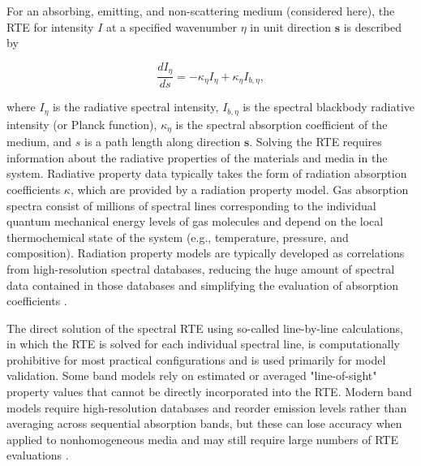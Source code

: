 \documentclass[preprint,12pt]{elsarticle}
\newcounter{bla}
\begin{document}
For an absorbing, emitting, and non-scattering medium (considered here), the RTE for intensity $I$ at a specified wavenumber $\eta$ in unit direction $\mathbf{s}$ is described by
% 
\begin{linenomath}
\begin{equation} \label{e:RTE_general}
    \frac{dI_{\eta}}{ds} = -\kappa_{\eta}I_{\eta} + \kappa_{\eta}I_{b,\eta},
\end{equation}
\end{linenomath}
%
where $I_{\eta}$ is the radiative spectral intensity, $I_{b,\eta}$ is the spectral blackbody radiative intensity (or Planck function), $\kappa_{\eta}$ is the spectral absorption coefficient of the medium, and $s$ is a path length along direction $\mathbf{s}$.  Solving the RTE requires information about the radiative properties of the materials and media in the system.  Radiative property data typically takes the form of radiation absorption coefficients $\kappa$, which are provided by a radiation property model.  Gas absorption spectra consist of millions of spectral lines corresponding to the individual quantum mechanical energy levels of gas molecules and depend on the local thermochemical state of the system (e.g., temperature, pressure, and composition).  
Radiation property models are typically developed as correlations from high-resolution spectral databases, reducing the huge amount of spectral data contained in those databases and simplifying the evaluation of absorption coefficients \cite{Zhang_2002b}.

The direct solution of the spectral RTE using so-called line-by-line calculations, in which the RTE is solved for each individual spectral line, is computationally prohibitive for most practical configurations and is used primarily for model validation. Some band models rely on estimated or averaged "line-of-sight" property values that cannot be directly incorporated into the RTE. 
Modern band models require high-resolution databases and reorder emission levels rather than averaging across sequential absorption bands, but these can lose accuracy when applied to nonhomogeneous media and may still require large numbers of RTE evaluations \citep{Modest_2016}.
\end{document}
